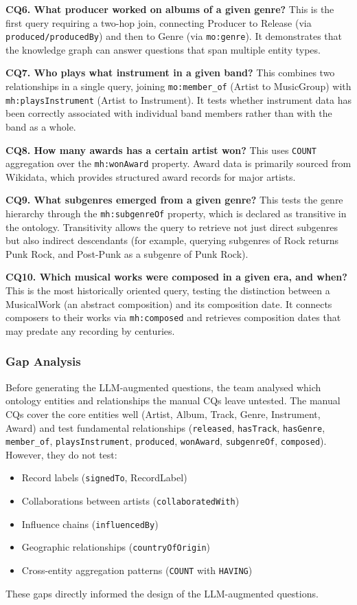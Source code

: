\documentclass[11pt,a4paper]{article}
\begin{document}
\textbf{CQ6. What producer worked on albums of a given genre?} This is the first query requiring a two-hop join, connecting Producer to Release (via \texttt{produced/producedBy}) and then to Genre (via \texttt{mo:genre}). It demonstrates that the knowledge graph can answer questions that span multiple entity types.

\textbf{CQ7. Who plays what instrument in a given band?} This combines two relationships in a single query, joining \texttt{mo:member\_of} (Artist to MusicGroup) with \texttt{mh:playsInstrument} (Artist to Instrument). It tests whether instrument data has been correctly associated with individual band members rather than with the band as a whole.

\textbf{CQ8. How many awards has a certain artist won?} This uses \texttt{COUNT} aggregation over the \texttt{mh:wonAward} property. Award data is primarily sourced from Wikidata, which provides structured award records for major artists.

\textbf{CQ9. What subgenres emerged from a given genre?} This tests the genre hierarchy through the \texttt{mh:subgenreOf} property, which is declared as transitive in the ontology. Transitivity allows the query to retrieve not just direct subgenres but also indirect descendants (for example, querying subgenres of Rock returns Punk Rock, and Post-Punk as a subgenre of Punk Rock).

\textbf{CQ10. Which musical works were composed in a given era, and when?} This is the most historically oriented query, testing the distinction between a MusicalWork (an abstract composition) and its composition date. It connects composers to their works via \texttt{mh:composed} and retrieves composition dates that may predate any recording by centuries.

\subsubsection{Gap Analysis}

Before generating the LLM-augmented questions, the team analysed which ontology entities and relationships the manual CQs leave untested. The manual CQs cover the core entities well (Artist, Album, Track, Genre, Instrument, Award) and test fundamental relationships (\texttt{released}, \texttt{hasTrack}, \texttt{hasGenre}, \texttt{member\_of}, \texttt{playsInstrument}, \texttt{produced}, \texttt{wonAward}, \texttt{subgenreOf}, \texttt{composed}). However, they do not test:
\begin{itemize}[nosep]
  \item Record labels (\texttt{signedTo}, RecordLabel)
  \item Collaborations between artists (\texttt{collaboratedWith})
  \item Influence chains (\texttt{influencedBy})
  \item Geographic relationships (\texttt{countryOfOrigin})
  \item Cross-entity aggregation patterns (\texttt{COUNT} with \texttt{HAVING})
\end{itemize}
These gaps directly informed the design of the LLM-augmented questions.
\end{document}
